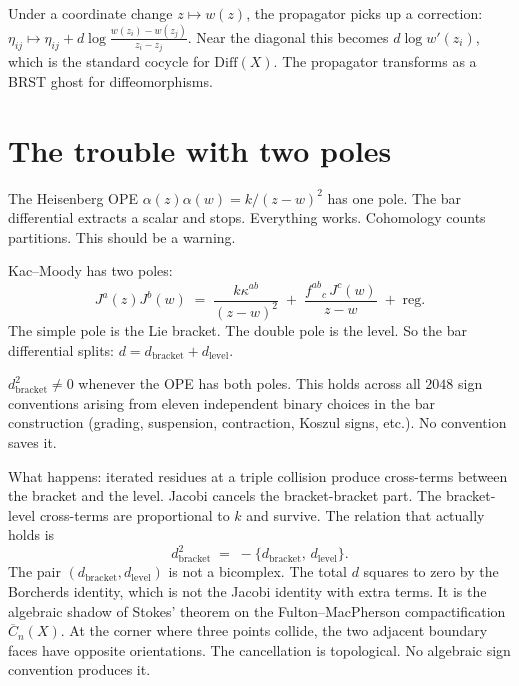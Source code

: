 \documentclass[11pt]{article}
\begin{document}
Under a coordinate change $z \mapsto w(z)$, the propagator picks
up a correction:
$\eta_{ij} \mapsto \eta_{ij} +
d\log\frac{w(z_i) - w(z_j)}{z_i - z_j}$.
Near the diagonal this becomes $d\log w'(z_i)$, which is the
standard cocycle for $\mathrm{Diff}(X)$.  The propagator
transforms as a BRST ghost for diffeomorphisms.


\section{The trouble with two poles}
\label{sec:trouble}

The Heisenberg OPE $\alpha(z)\alpha(w) = k/(z-w)^2$ has one pole.
The bar differential extracts a scalar and stops.  Everything works.
Cohomology counts partitions.  This should be a warning.

Kac--Moody has two poles:
\[
J^a(z) J^b(w) \;=\; \frac{k\kappa^{ab}}{(z-w)^2}
  \;+\; \frac{f^{ab}{}_c\, J^c(w)}{z-w} \;+\; \mathrm{reg}.
\]
The simple pole is the Lie bracket.  The double pole is the level.
So the bar differential splits: $d = d_{\mathrm{bracket}} +
d_{\mathrm{level}}$.

$d_{\mathrm{bracket}}^2 \neq 0$ whenever
the OPE has both poles.  This holds across all $2048$ sign
conventions arising from eleven independent binary choices in the
bar construction (grading, suspension, contraction, Koszul signs,
etc.).  No convention saves it.

What happens: iterated residues at a triple collision produce cross-terms
between the bracket and the level.  Jacobi cancels the
bracket-bracket part.  The bracket-level cross-terms are
proportional to $k$ and survive.  The relation that actually holds
is
\begin{equation}\label{eq:cross-term}
d_{\mathrm{bracket}}^2
\;=\; -\{d_{\mathrm{bracket}},\, d_{\mathrm{level}}\}.
\end{equation}
The pair $(d_{\mathrm{bracket}}, d_{\mathrm{level}})$ is not a
bicomplex.  The total $d$ squares to zero by the Borcherds identity,
which is not the Jacobi identity with extra terms.  It is the
algebraic shadow of Stokes' theorem on the Fulton--MacPherson
compactification $\overline{C}_n(X)$.  At the corner where three
points collide, the two adjacent boundary faces have opposite
orientations.  The cancellation is topological.  No algebraic sign
convention produces it.
\end{document}
